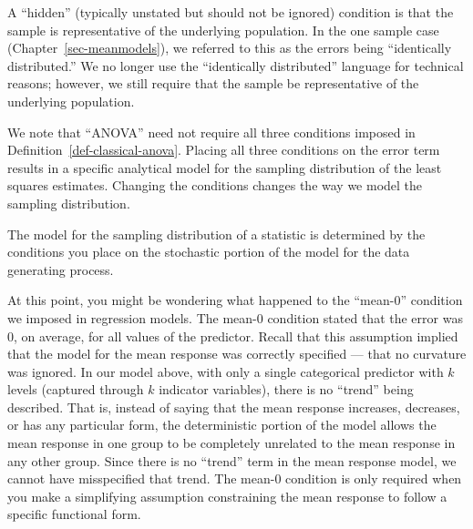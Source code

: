 \documentclass[
  letterpaper,
  DIV=11,
  numbers=noendperiod]{scrreprt}
\theoremstyle{plain}
\theoremstyle{definition}
\theoremstyle{definition}
\theoremstyle{remark}
\begin{document}
\begin{tcolorbox}[enhanced jigsaw, breakable, titlerule=0mm, colframe=quarto-callout-warning-color-frame, bottomtitle=1mm, opacityback=0, rightrule=.15mm, toptitle=1mm, arc=.35mm, bottomrule=.15mm, left=2mm, title=\textcolor{quarto-callout-warning-color}{\faExclamationTriangle}\hspace{0.5em}{Warning}, leftrule=.75mm, coltitle=black, toprule=.15mm, colbacktitle=quarto-callout-warning-color!10!white, colback=white, opacitybacktitle=0.6]

A ``hidden'' (typically unstated but should not be ignored) condition is
that the sample is representative of the underlying population. In the
one sample case (Chapter~\ref{sec-meanmodels}), we referred to this as
the errors being ``identically distributed.'' We no longer use the
``identically distributed'' language for technical reasons; however, we
still require that the sample be representative of the underlying
population.

\end{tcolorbox}

We note that ``ANOVA'' need not require all three conditions imposed in
Definition~\ref{def-classical-anova}. Placing all three conditions on
the error term results in a specific analytical model for the sampling
distribution of the least squares estimates. Changing the conditions
changes the way we model the sampling distribution.

\begin{tcolorbox}[enhanced jigsaw, breakable, titlerule=0mm, colframe=quarto-callout-tip-color-frame, bottomtitle=1mm, opacityback=0, rightrule=.15mm, toptitle=1mm, arc=.35mm, bottomrule=.15mm, left=2mm, title=\textcolor{quarto-callout-tip-color}{\faLightbulb}\hspace{0.5em}{Big Idea}, leftrule=.75mm, coltitle=black, toprule=.15mm, colbacktitle=quarto-callout-tip-color!10!white, colback=white, opacitybacktitle=0.6]

The model for the sampling distribution of a statistic is determined by
the conditions you place on the stochastic portion of the model for the
data generating process.

\end{tcolorbox}

At this point, you might be wondering what happened to the ``mean-0''
condition we imposed in regression models. The mean-0 condition stated
that the error was 0, on average, for all values of the predictor.
Recall that this assumption implied that the model for the mean response
was correctly specified --- that no curvature was ignored. In our model
above, with only a single categorical predictor with \(k\) levels
(captured through \(k\) indicator variables), there is no ``trend''
being described. That is, instead of saying that the mean response
increases, decreases, or has any particular form, the deterministic
portion of the model allows the mean response in one group to be
completely unrelated to the mean response in any other group. Since
there is no ``trend'' term in the mean response model, we cannot have
misspecified that trend. The mean-0 condition is only required when you
make a simplifying assumption constraining the mean response to follow a
specific functional form.
\end{document}
